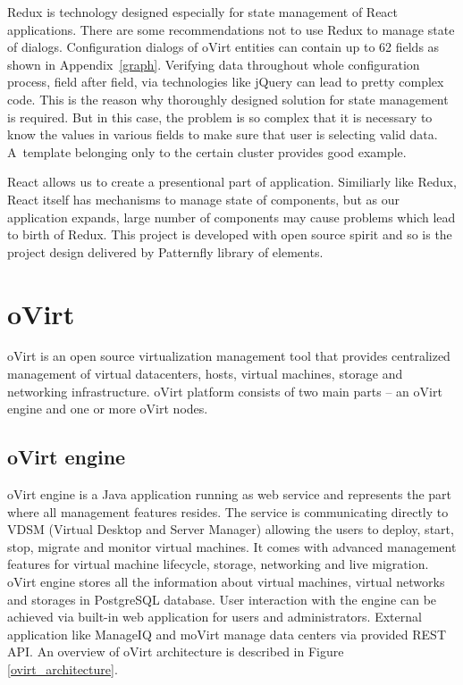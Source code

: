 Redux is technology designed especially for state management of React \cite{React} applications. There are some recommendations not to use Redux \cite{Redux} to manage state of dialogs. Configuration dialogs of oVirt entities can contain up to 62 fields as shown in Appendix~\ref{graph}. Verifying data throughout whole configuration process, field after field, via technologies like jQuery can lead to pretty complex code. This is the reason why thoroughly designed solution for state management is required. But in this case, the problem is so complex that it is necessary to know the values in various fields to make sure that user is selecting valid data. A~template belonging only to the certain cluster provides good example.

React allows us to create a presentional part of application. Similiarly like Redux, React itself has mechanisms to manage state of components, but as our application expands, large number of components may cause problems which lead to birth of Redux. This project is developed with open source spirit and so is the project design delivered by Patternfly \cite{Patternfly} library of elements.

\chapter{oVirt}
oVirt is an open source virtualization management tool that provides centralized management of virtual datacenters, hosts, virtual machines, storage and networking infrastructure. oVirt platform consists of two main parts -- an oVirt engine and one or more oVirt nodes.


\section{oVirt engine}
oVirt engine is a Java application running as web service and represents the part where all management features resides. The service is communicating directly to VDSM (Virtual Desktop and Server Manager) allowing the users to deploy, start, stop, migrate and monitor virtual machines. It comes with advanced management features for virtual machine lifecycle, storage, networking and live migration. oVirt engine stores all the information about virtual machines, virtual networks and storages in PostgreSQL \cite{postgre} database. User interaction with the engine can be achieved via built-in web application for users and administrators. External application like ManageIQ and moVirt manage data centers via provided REST API. An overview of oVirt architecture is described in Figure \ref{ovirt_architecture}.

